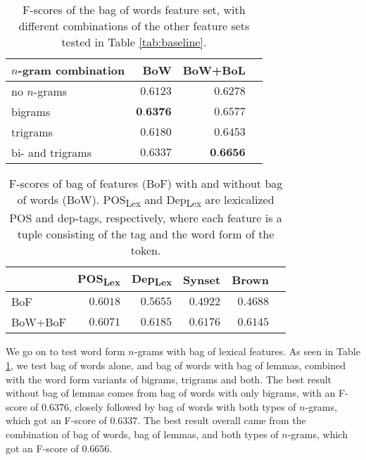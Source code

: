 \documentclass[11pt,letterpaper]{article}
\begin{document}
\begin{table}
  \begin{center}
    \begin{tabular}{lrrr}
      \toprule
      
      $n$-gram combination & BoW & BoW+BoL \\
      \midrule
      no $n$-grams & $0.6123$ & $0.6278$ \\
      bigrams & $\textbf{0.6376}$ & $0.6577$ \\
      trigrams & $0.6180$ & $0.6453$ \\
      bi- and trigrams & $0.6337$ & $\textbf{0.6656}$ \\
      \bottomrule

    \end{tabular}
  \end{center}
  \caption{F-scores of the bag of words feature set, with different combinations of the other feature sets tested in Table \ref{tab:baseline}.}
  \label{tab:ngrams}
\end{table}

\begin{table}
  \begin{center}
    \begin{tabular}{lrrrrr}
      \toprule
      
     & POS\textsubscript{Lex} & Dep\textsubscript{Lex} & Synset & Brown\\ %
      \midrule
      BoF & $0.6018$ & $0.5655$ & $0.4922$ & $0.4688$ \\ %
      BoW+BoF & $0.6071$ & $0.6185$ & $0.6176$ & $0.6145$\\ %
      
      \bottomrule

    \end{tabular}
  \end{center}
  \caption{F-scores of bag of features (BoF) with and without bag of words (BoW). POS\textsubscript{Lex} and Dep\textsubscript{Lex} are lexicalized POS and dep-tags, respectively, where each feature is a tuple consisting of the tag and the word form of the token.}
  \label{tab:bagOfFeatures}
\end{table}



We go on to test word form $n$-grams with bag of lexical features. As seen in Table \ref{tab:ngrams}, we test bag of words alone, and bag of words with bag of lemmas, combined with the word form variants of bigrams, trigrams and both. The best result without bag of lemmas comes from bag of words with only bigrams, with an F-score of $0.6376$, closely followed by bag of words with both types of $n$-grams, which got an F-score of $0.6337$. The best result overall came from the combination of bag of words, bag of lemmas, and both types of $n$-grams, which got an F-score of $0.6656$.
\end{document}
